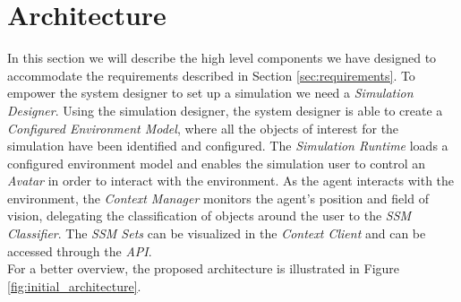 \section{Architecture} %
\label{sec:architecture}
In this section we will describe the high level components we have designed to accommodate the requirements described in Section \ref{sec:requirements}. To empower the system designer to set up a simulation we need a \emph{Simulation Designer}. Using the simulation designer, the system designer is able to create a \emph{Configured Environment Model}, where all the objects of interest for the simulation have been identified and configured. The \emph{Simulation Runtime} loads a configured environment model and enables the simulation user to control an \emph{Avatar} in order to interact with the environment. As the agent interacts with the environment, the \emph{Context Manager} monitors the agent's position and field of vision, delegating the classification of objects around the user to the \emph{SSM Classifier}. The \emph{SSM Sets} can be visualized in the \emph{Context Client} and can be accessed through the \emph{API}.\\

For a better overview, the proposed architecture is illustrated in Figure \ref{fig:initial_architecture}.

